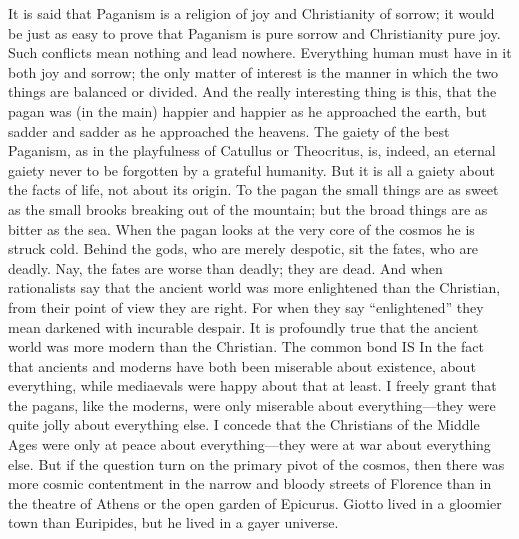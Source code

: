 \documentclass{book}
\begin{document}
It is said that Paganism is a religion of joy and Christianity of sorrow; it would be just as easy to prove that Paganism is pure sorrow and Christianity pure joy. Such conflicts mean nothing and lead nowhere. Everything human must have in it both joy and sorrow; the only matter of interest is the manner in which the two things are balanced or divided. And the really interesting thing is this, that the pagan was (in the main) happier and happier as he approached the earth, but sadder and sadder as he approached the heavens. The gaiety of the best Paganism, as in the playfulness of Catullus or Theocritus, is, indeed, an eternal gaiety never to be forgotten by a grateful humanity. But it is all a gaiety about the facts of life, not about its origin. To the pagan the small things are as sweet as the small brooks breaking out of the mountain; but the broad things are as bitter as the sea. When the pagan looks at the very core of the cosmos he is struck cold. Behind the gods, who are merely despotic, sit the fates, who are deadly. Nay, the fates are worse than deadly; they are dead. And when rationalists say that the ancient world was more enlightened than the Christian, from their point of view they are right. For when they say “enlightened” they mean darkened with incurable despair. It is profoundly true that the ancient world was more modern than the Christian. The common bond IS In the fact that ancients and moderns have both been miserable about existence, about everything, while mediaevals were happy about that at least. I freely grant that the pagans, like the moderns, were only miserable about everything—they were quite jolly about everything else. I concede that the Christians of the Middle Ages were only at peace about everything—they were at war about everything else. But if the question turn on the primary pivot of the cosmos, then there was more cosmic contentment in the narrow and bloody streets of Florence than in the theatre of Athens or the open garden of Epicurus. Giotto lived in a gloomier town than Euripides, but he lived in a gayer universe.
\end{document}
